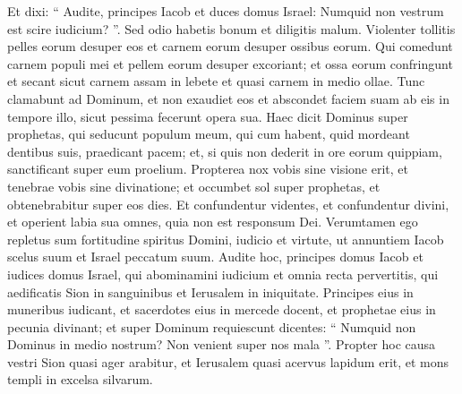 \begin{biblechapter}
\begin{biblechapter}
\begin{biblechapter}
 \verse Et dixi:
 “ Audite, principes Iacob
 et duces domus Israel:
 Numquid non vestrum est scire iudicium? ”.
 \verse Sed odio habetis bonum et diligitis malum.
 Violenter tollitis pelles eorum desuper eos
 et carnem eorum desuper ossibus eorum.
 \verse Qui comedunt carnem populi mei
 et pellem eorum desuper excoriant; et ossa eorum confringunt
 et secant sicut carnem assam in lebete
 et quasi carnem in medio ollae.
 \verse Tunc clamabunt ad Dominum,
 et non exaudiet eos
 et abscondet faciem suam ab eis
 in tempore illo,
 sicut pessima fecerunt opera sua.
 \verse Haec dicit Dominus super prophetas,
 qui seducunt populum meum,
 qui cum habent, quid mordeant dentibus suis,
 praedicant pacem;
 et, si quis non dederit in ore eorum quippiam,
 sanctificant super eum proelium.
 \verse Propterea nox vobis sine visione erit,
 et tenebrae vobis sine divinatione; et occumbet sol super prophetas,
 et obtenebrabitur super eos dies.
 \verse Et confundentur videntes,
 et confundentur divini,
 et operient labia sua omnes,
 quia non est responsum Dei.
 \verse Verumtamen ego repletus sum
 fortitudine spiritus Domini,
 iudicio et virtute,
 ut annuntiem Iacob scelus suum
 et Israel peccatum suum.
 \verse Audite hoc, principes domus Iacob
 et iudices domus Israel,
 qui abominamini iudicium
 et omnia recta pervertitis,
 \verse qui aedificatis Sion in sanguinibus
 et Ierusalem in iniquitate.
 \verse Principes eius in muneribus iudicant,
 et sacerdotes eius in mercede docent,
 et prophetae eius in pecunia divinant;
 et super Dominum requiescunt dicentes:
 “ Numquid non Dominus in medio nostrum?
 Non venient super nos mala ”.
 \verse Propter hoc causa vestri
 Sion quasi ager arabitur,
 et Ierusalem quasi acervus lapidum erit,
 et mons templi in excelsa silvarum.
 

\end{biblechapter}
\end{biblechapter}
\end{biblechapter}
